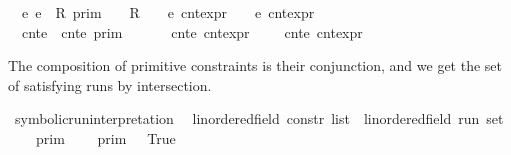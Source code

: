 \begin{isabellebody}
{\isacharbar}\ {\isacartoucheopen}{\isasymlbrakk}\ {\isasymlceil}e\ e\ {\isasymin}\ R\ {\isasymrbrakk}\isactrlsub p\isactrlsub r\isactrlsub i\isactrlsub m\ {\isacharequal}\ {\isacharbraceleft}\ {\isasymrho}{\isachardot}\ R\ {\isacharparenleft}{\isasymlbrakk}\ {\isasymrho}\ {\isasymturnstile}\ e\ {\isasymrbrakk}\isactrlsub c\isactrlsub n\isactrlsub t\isactrlsub e\isactrlsub x\isactrlsub p\isactrlsub r{\isacharcomma}\ {\isasymlbrakk}\ {\isasymrho}\ {\isasymturnstile}\ e\ {\isasymrbrakk}\isactrlsub c\isactrlsub n\isactrlsub t\isactrlsub e\isactrlsub x\isactrlsub p\isactrlsub r{\isacharparenright}\ {\isacharbraceright}{\isacartoucheclose}\isanewline
{\isacharbar}\ {\isacartoucheopen}{\isasymlbrakk}\ cnt{\isacharunderscore}e\ {\isasympreceq}\ cnt{\isacharunderscore}e\ {\isasymrbrakk}\isactrlsub p\isactrlsub r\isactrlsub i\isactrlsub m\ {\isacharequal}\ {\isacharbraceleft}\ {\isasymrho}{\isachardot}\ {\isasymlbrakk}\ {\isasymrho}\ {\isasymturnstile}\ cnt{\isacharunderscore}e\ {\isasymrbrakk}\isactrlsub c\isactrlsub n\isactrlsub t\isactrlsub e\isactrlsub x\isactrlsub p\isactrlsub r\ {\isasymle}\ {\isasymlbrakk}\ {\isasymrho}\ {\isasymturnstile}\ cnt{\isacharunderscore}e\ {\isasymrbrakk}\isactrlsub c\isactrlsub n\isactrlsub t\isactrlsub e\isactrlsub x\isactrlsub p\isactrlsub r\ {\isacharbraceright}{\isacartoucheclose}%
\begin{isamarkuptext}%
The composition of primitive constraints is their conjunction, and we get the
  set of satisfying runs by intersection.%
\end{isamarkuptext}\isamarkuptrue%
\isamarkupfalse%
\ symbolic{\isacharunderscore}run{\isacharunderscore}interpretation\isanewline
\ \ {\isacharcolon}{\isacharcolon}{\isacartoucheopen}{\isacharparenleft}{\isacharprime}{\isasymtau}{\isacharcolon}{\isacharcolon}linordered{\isacharunderscore}field{\isacharparenright}\ constr\ list\ {\isasymRightarrow}\ {\isacharparenleft}{\isacharprime}{\isasymtau}{\isacharcolon}{\isacharcolon}linordered{\isacharunderscore}field{\isacharparenright}\ run\ set{\isacartoucheclose}\isanewline
\ \ {\isacharparenleft}{\isacartoucheopen}{\isasymlbrakk}{\isasymlbrakk}\ {\isacharunderscore}\ {\isasymrbrakk}{\isasymrbrakk}\isactrlsub p\isactrlsub r\isactrlsub i\isactrlsub m{\isacartoucheclose}{\isacharparenright}\isanewline
{}\isanewline
\ \ {\isacartoucheopen}{\isasymlbrakk}{\isasymlbrakk}\ {\isacharbrackleft}{\isacharbrackright}\ {\isasymrbrakk}{\isasymrbrakk}\isactrlsub p\isactrlsub r\isactrlsub i\isactrlsub m\ {\isacharequal}\ {\isacharbraceleft}{\isasymrho}{\isachardot}\ True\ {\isacharbraceright}{\isacartoucheclose}\isanewline

\end{isabellebody}
